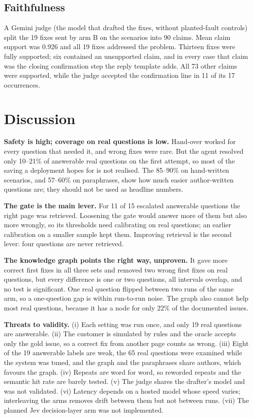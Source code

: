 \documentclass[cameraready]{ieeeconf}
\begin{document}
\subsection{Faithfulness}
A Gemini judge (the model that drafted the fixes, without planted-fault controls) split the 19 fixes sent by arm B on the scenarios into 90 claims. Mean claim support was 0.926 and all 19 fixes addressed the problem. Thirteen fixes were fully supported; six contained an unsupported claim, and in every case that claim was the closing confirmation step the reply template adds. All 73 other claims were supported, while the judge accepted the confirmation line in 11 of its 17 occurrences.

\section{Discussion}\label{sec:discussion}
\textbf{Safety is high; coverage on real questions is low.} Hand-over worked for every question that needed it, and wrong fixes were rare. But the agent resolved only 10--21\% of answerable real questions on the first attempt, so most of the saving a deployment hopes for is not realised. The 85--90\% on hand-written scenarios, and 57--60\% on paraphrases, show how much easier author-written questions are; they should not be used as headline numbers.

\textbf{The gate is the main lever.} For 11 of 15 escalated answerable questions the right page was retrieved. Loosening the gate would answer more of them but also more wrongly, so its thresholds need calibrating on real questions; an earlier calibration on a smaller sample kept them. Improving retrieval is the second lever: four questions are never retrieved.

\textbf{The knowledge graph points the right way, unproven.} It gave more correct first fixes in all three sets and removed two wrong first fixes on real questions, but every difference is one or two questions, all intervals overlap, and no test is significant. One real question flipped between two runs of the same arm, so a one-question gap is within run-to-run noise. The graph also cannot help most real questions, because it has a node for only 22\% of the documented issues.

\textbf{Threats to validity.} (i) Each setting was run once, and only 19 real questions are answerable. (ii) The customer is simulated by rules and the oracle accepts only the gold issue, so a correct fix from another page counts as wrong. (iii) Eight of the 19 answerable labels are weak, the 65 real questions were examined while the system was tuned, and the graph and the paraphrases share authors, which favours the graph. (iv) Repeats are word for word, so reworded repeats and the semantic hit rate are barely tested. (v) The judge shares the drafter's model and was not validated. (vi) Latency depends on a hosted model whose speed varies; interleaving the arms removes drift between them but not between runs. (vii) The planned Jev decision-layer arm was not implemented.
\end{document}

